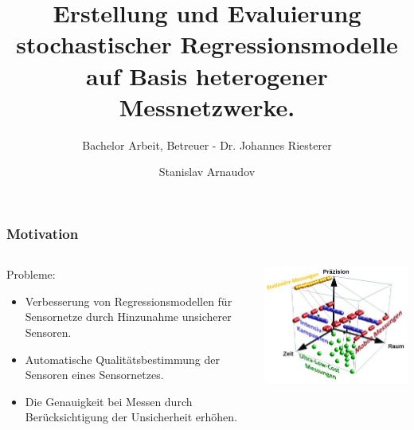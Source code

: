 \documentclass[18pt]{beamer}
\title[Short title]{Erstellung und Evaluierung stochastischer Regressionsmodelle auf Basis heterogener Messnetzwerke.}
\subtitle{Bachelor Arbeit, Betreuer - Dr. Johannes Riesterer}
\author{Stanislav Arnaudov}
\institute{TECO - Das Telecooperation Office}
\begin{document}
 



\begin{frame}
 \titlepage
\end{frame}

\begin{frame}
  \frametitle{Motivation}
  
  \begin{columns}
    \begin{column}{0.4\textwidth}
      Probleme:
      \begin{itemize}
      \item Verbesserung von Regressionsmodellen für Sensornetze  durch Hinzunahme unsicherer Sensoren.
      \item Automatische Qualitätsbestimmung der Sensoren eines Sensornetzes.
      \item Die Genauigkeit bei Messen durch Berücksichtigung der Unsicherheit erhöhen.
      \end{itemize}
    \end{column}
    \begin{column}{0.6\textwidth}
      \begin{center}
        \includegraphics[scale=0.5]{images/motivation}
      \end{center}
    \end{column}
  \end{columns}
  
\end{frame}
\end{document}
